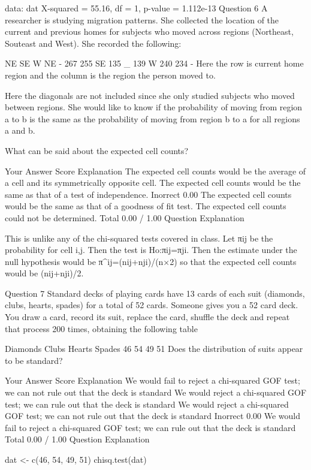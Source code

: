 data:  dat 
X-squared = 55.16, df = 1, p-value = 1.112e-13
Question 6
A researcher is studying migration patterns. She collected the location of the current and previous homes for subjects who moved across regions (Northeast, Souteast and West). She recorded the following:

NE	SE	W
NE	-	267	255
SE	135	_	139
W	240	234	-
Here the row is current home region and the column is the region the person moved to.

Here the diagonals are not included since she only studied subjects who moved between regions. She would like to know if the probability of moving from region a to b is the same as the probability of moving from region b to a for all regions a and b.

What can be said about the expected cell counts?

Your Answer		Score	Explanation
The expected cell counts would be the average of a cell and its symmetrically opposite cell.			
The expected cell counts would be the same as that of a test of independence.	Inorrect	0.00	
The expected cell counts would be the same as that of a goodness of fit test.			
The expected cell counts could not be determined.			
Total		0.00 / 1.00	
Question Explanation

This is unlike any of the chi-squared tests covered in class. Let πij be the probability for cell i,j. Then the test is Ho:πij=πji. Then the estimate under the null hypothesis would be π^ij=(nij+nji)/(n×2) so that the expected cell counts would be (nij+nji)/2.

Question 7
Standard decks of playing cards have 13 cards of each suit (diamonds, clubs, hearts, spades) for a total of 52 cards. Someone gives you a 52 card deck. You draw a card, record its suit, replace the card, shuffle the deck and repeat that process 200 times, obtaining the following table

Diamonds	Clubs	Hearts	Spades
46	54	49	51
Does the distribution of suits appear to be standard?

Your Answer		Score	Explanation
We would fail to reject a chi-squared GOF test; we can not rule out that the deck is standard			
We would reject a chi-squared GOF test; we can rule out that the deck is standard			
We would reject a chi-squared GOF test; we can not rule out that the deck is standard	Inorrect	0.00	
We would fail to reject a chi-squared GOF test; we can rule out that the deck is standard			
Total		0.00 / 1.00	
Question Explanation

dat <- c(46, 54, 49, 51)
chisq.test(dat)

